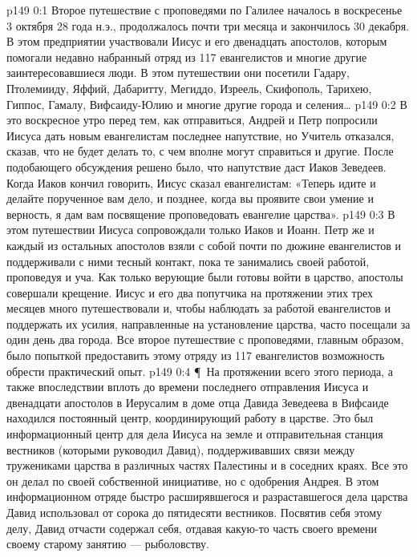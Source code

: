 \author{Комиссия срединников}
\vs p149 0:1 Второе путешествие с проповедями по Галилее началось в воскресенье 3 октября 28 года н.э., продолжалось почти три месяца и закончилось 30 декабря. В этом предприятии участвовали Иисус и его двенадцать апостолов, которым помогали недавно набранный отряд из 117 евангелистов и многие другие заинтересовавшиеся люди. В этом путешествии они посетили Гадару, Птолемииду, Яффий, Дабаритту, Мегиддо, Изреель, Скифополь, Тарихею, Гиппос, Гамалу, Вифсаиду\hyp{}Юлию и многие другие города и селения\ldots
\vs p149 0:2 В это воскресное утро перед тем, как отправиться, Андрей и Петр попросили Иисуса дать новым евангелистам последнее напутствие, но Учитель отказался, сказав, что не будет делать то, с чем вполне могут справиться и другие. После подобающего обсуждения решено было, что напутствие даст Иаков Зеведеев. Когда Иаков кончил говорить, Иисус сказал евангелистам: «Теперь идите и делайте порученное вам дело, и позднее, когда вы проявите свои умение и верность, я дам вам посвящение проповедовать евангелие царства».
\vs p149 0:3 В этом путешествии Иисуса сопровождали только Иаков и Иоанн. Петр же и каждый из остальных апостолов взяли с собой почти по дюжине евангелистов и поддерживали с ними тесный контакт, пока те занимались своей работой, проповедуя и уча. Как только верующие были готовы войти в царство, апостолы совершали крещение. Иисус и его два попутчика на протяжении этих трех месяцев много путешествовали и, чтобы наблюдать за работой евангелистов и поддержать их усилия, направленные на установление царства, часто посещали за один день два города. Все второе путешествие с проповедями, главным образом, было попыткой предоставить этому отряду из 117 евангелистов возможность обрести практический опыт.
\vs p149 0:4 \P\ На протяжении всего этого периода, а также впоследствии вплоть до времени последнего отправления Иисуса и двенадцати апостолов в Иерусалим в доме отца Давида Зеведеева в Вифсаиде находился постоянный центр, координирующий работу в царстве. Это был информационный центр для дела Иисуса на земле и отправительная станция вестников (которыми руководил Давид), поддерживавших связи между тружениками царства в различных частях Палестины и в соседних краях. Все это он делал по своей собственной инициативе, но с одобрения Андрея. В этом информационном отряде быстро расширявшегося и разраставшегося дела царства Давид использовал от сорока до пятидесяти вестников. Посвятив себя этому делу, Давид отчасти содержал себя, отдавая какую\hyp{}то часть своего времени своему старому занятию --- рыболовству.
